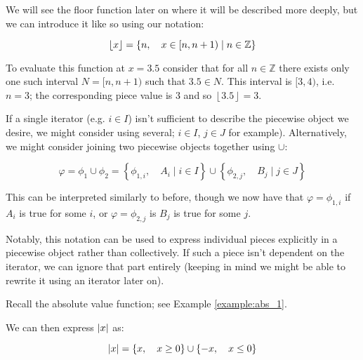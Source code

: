 \begin{example}
    We will see the floor function later on where it will be described more deeply, but we can introduce it like so using our notation:

    $$
        \lfloor x\rfloor=\left\{n,\quad x\in[n,n+1)\mid n\in\mathbb{Z}\right\}
    $$

    To evaluate this function at $x=3.5$ consider that for all $n\in\mathbb{Z}$ there exists only one such interval $N=[n,n+1)$ such that $3.5\in N$. This interval is $[3,4)$, i.e. $n=3$; the corresponding piece value is $3$ and so $\left\lfloor 3.5\right\rfloor=3$.
\end{example}

If a single iterator (e.g. $i\in I$) isn't sufficient to describe the piecewise object we desire, we might consider using several; $i\in I$, $j\in J$ for example). Alternatively, we might consider joining two piecewise objects together using $\cup$:

$$
\varphi = \phi_1 \cup \phi_2 = \left\{\phi_{1,i},\quad A_i\mid i\in I\right\}\cup\left\{\phi_{2,j},\quad B_j\mid j\in J\right\}
$$

This can be interpreted similarly to before, though we now have that $\varphi=\phi_{1,i}$ if $A_i$ is true for some $i$, or $\varphi=\phi_{2,j}$ is $B_j$ is true for some $j$. 

Notably, this notation can be used to express individual pieces explicitly in a piecewise object rather than collectively. If such a piece isn't dependent on the iterator, we can ignore that part entirely (keeping in mind we might be able to rewrite it using an iterator later on).

\begin{example}
    \label{example:abs_2}

    Recall the absolute value function; see Example \ref{example:abs_1}.

    We can then express $\abs{x}$ as:

    $$
        \abs{x} = \{x,\quad x\geq 0\}\cup\{-x,\quad x\leq 0\}
    $$
\end{example}

\newpage{}